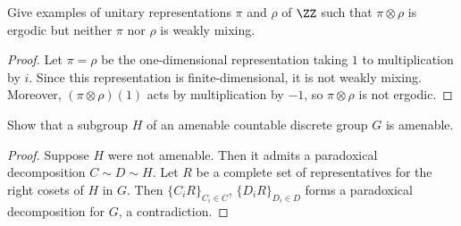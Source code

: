 \documentclass{article}
\begin{document}
 Give examples of unitary representations $\pi$ and $\rho$ of $\ZZ$ such that $\pi \otimes \rho$ is ergodic but neither $\pi$ nor $\rho$ is weakly mixing.
\begin{proof}
Let $\pi = \rho$ be the one-dimensional representation taking $1$ to multiplication by $i$.  Since this representation is finite-dimensional, it is not weakly mixing. Moreover, $(\pi \otimes \rho)(1)$ acts by multiplication by $-1$, so $\pi \otimes \rho$ is not ergodic.
\end{proof}

 Show that a subgroup $H$ of an amenable countable discrete group $G$ is amenable.
\begin{proof}
Suppose $H$ were not amenable.  Then it admits a paradoxical decomposition $C \sim D \sim H$. Let $R$ be a complete set of representatives for the right cosets of $H$ in $G$. Then $\{C_iR\}_{C_i \in C}$, $\{D_iR\}_{D_i \in D}$ forms a paradoxical decomposition for $G$, a contradiction.
\end{proof}
\end{document}
